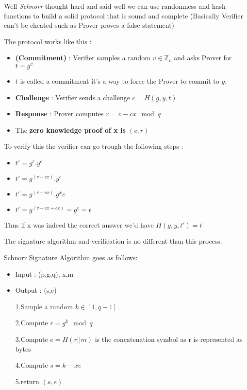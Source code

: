 \documentclass[11pt]{article}
\begin{document}
Well \emph{Schnorr} thought hard and said well we can use randomness and
hash functions to build a solid protocol that is sound and complete
(Basically Verifier can't be cheated such as Prover proves a false
statement)

The protocol works like this :

\begin{itemize}
\item
  \textbf{(Commitment)} : Verifier samples a random
  \(v \in \mathbb{Z_q}\) and asks Prover for \(t = g^v\)
\item
  \(t\) is called a commitment it's a way to force the Prover to commit
  to \(g\).
\item
  \textbf{Challenge} : Verifier sends a challenge \(c = H(g,y,t)\)
\item
  \textbf{Response} : Prover computes \(r = v -cx \mod q\)
\item
  The \textbf{zero knowledge proof of x is \((c,r)\)}
\end{itemize}

To verify this the verifier can go trough the following steps :

\begin{itemize}
\item
  \(t' = g^r.y^c\)
\item
  \(t' = g^{(v-cx)}.y^c\)
\item
  \(t' = g^{(v-cx)}.g^xc\)
\item
  \(t' = g^{(v-cx + cx)} = g^v = t\)
\end{itemize}

Thus if x was indeed the correct answer we'd have \(H(g,y,t') = t\)

The signature algorithm and verification is no different than this
process.

Schnorr Signature Algorithm goes as follows:

\begin{itemize}
\item
  Input : (p,g,q), x,m
\item
  Output : (s,e)

  1.Sample a random \(k \in [1,q-1]\).

  2.Compute \(r = g^k \mod q\)

  3.Compute \(e = H(r||m)\) \textbar{}\textbar{} is the concatenation
  symbol as r is represented as bytes

  4.Compute \(s = k - xe\)

  5.return \((s,e)\)
\end{itemize}
\end{document}
